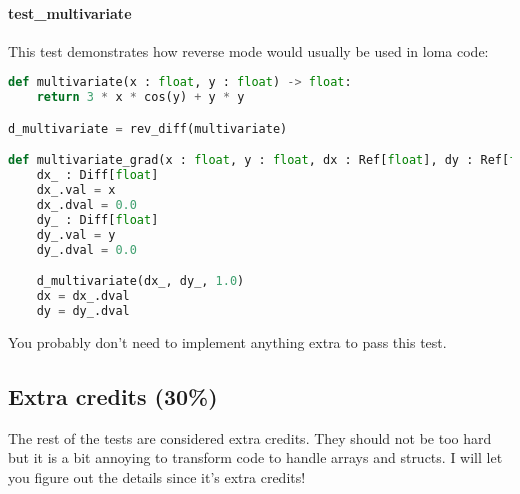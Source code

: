 \paragraph{test_multivariate} This test demonstrates how reverse mode would usually be used in loma code:
\begin{lstlisting}[language=Python]
def multivariate(x : float, y : float) -> float:
    return 3 * x * cos(y) + y * y

d_multivariate = rev_diff(multivariate)

def multivariate_grad(x : float, y : float, dx : Ref[float], dy : Ref[float]):
    dx_ : Diff[float]
    dx_.val = x
    dx_.dval = 0.0
    dy_ : Diff[float]
    dy_.val = y
    dy_.dval = 0.0

    d_multivariate(dx_, dy_, 1.0)
    dx = dx_.dval
    dy = dy_.dval
\end{lstlisting}
You probably don't need to implement anything extra to pass this test.

\subsection{Extra credits (30\%)}
The rest of the tests are considered extra credits. They should not be too hard but it is a bit annoying to transform code to handle arrays and structs. I will let you figure out the details since it's extra credits!


